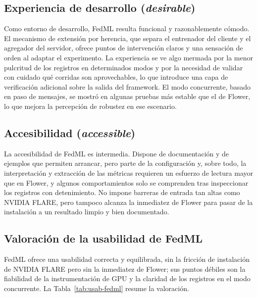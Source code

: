 \subsection{Experiencia de desarrollo (\textit{desirable})}\label{sec:usab-fedml-desirable}

Como entorno de desarrollo, FedML resulta funcional y razonablemente cómodo. El mecanismo de
extensión por herencia, que separa el entrenador del cliente y el agregador del servidor,
ofrece puntos de intervención claros y una sensación de orden al adaptar el experimento. La
experiencia se ve algo mermada por la menor pulcritud de los registros en determinados modos
y por la necesidad de validar con cuidado qué corridas son aprovechables, lo que introduce una
capa de verificación adicional sobre la salida del framework. El modo concurrente, basado en
paso de mensajes, se mostró en algunas pruebas más estable que el de Flower, lo que mejora la
percepción de robustez en ese escenario.

\subsection{Accesibilidad (\textit{accessible})}\label{sec:usab-fedml-accessible}

La accesibilidad de FedML es intermedia. Dispone de documentación y de ejemplos que permiten
arrancar, pero parte de la configuración y, sobre todo, la interpretación y extracción de las
métricas requieren un esfuerzo de lectura mayor que en Flower, y algunos comportamientos solo
se comprenden tras inspeccionar los registros con detenimiento. No impone barreras de entrada
tan altas como NVIDIA FLARE, pero tampoco alcanza la inmediatez de Flower para pasar de la
instalación a un resultado limpio y bien documentado.

\subsection{Valoración de la usabilidad de FedML}\label{sec:usab-fedml-valoracion}

FedML ofrece una usabilidad correcta y equilibrada, sin la fricción de instalación de NVIDIA
FLARE pero sin la inmediatez de Flower; sus puntos débiles son la fiabilidad de la
instrumentación de GPU y la claridad de los registros en el modo concurrente. La
Tabla~\ref{tab:usab-fedml} resume la valoración.

